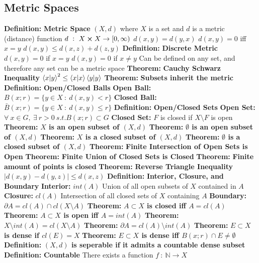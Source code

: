 \documentclass[14pt]{extarticle}
\def\Definition{{\color{Blue} \textbf{Definition:} }}
\def\Theorem{{\color{Red} \textbf{Theorem:} }}
\begin{document}
\begin{outline}
		\section{Metric Spaces}
		\1	\Definition \textbf{Metric Space}
			\2	$(X,d)$ where $X$ is a set and $d$ is a metric (distance) function
			\2	$d~:~X \cross X \rightarrow [0,\infty)$
				\3	$d(x,y) = d(y,x)$
				\3	$d(x,y) = 0$ iff $x = y$
				\3	$d(x,y) \le d(x,z) + d(z,y)$
		\1	\Definition \textbf{Discrete Metric}
			\2	$d(x,y) = 0$ if $x = y$
			\2	$d(x,y) = 0$ if $x \ne y$
			\2	Can be defined on any set, and therefore any set can be a metric space
		\1	\Theorem \textbf{Cauchy Schwarz Inequality}
			\2	$\braket{x}{y}^2 \le \braket{x}{x}\braket{y}{y}$
		\1	\Theorem \textbf{Subsets inherit the metric}
		\1	\Definition \textbf{Open/Closed Balls}
			\2	\textbf{Open Ball: } $B(x;r) = \{y \in X~:~d(x,y) < r\}$
			\2	\textbf{Closed Ball: } $\bar{B}(x;r) = \{y \in X~:~d(x,y) \le r\}$
		\1	\Definition \textbf{Open/Closed Sets}
			\2	\textbf{Open Set: } $\forall~x \in G,~\exists~r > 0~s.t. B(x;r) \subset G$
			\2	\textbf{Closed Set: } $F$ is closed if $X \setminus F$ is open
			\2	\Theorem \textbf{$X$ is an open subset of $(X,d)$}
			\2	\Theorem \textbf{$\emptyset$ is an open subset of $(X,d)$}
			\2	\Theorem \textbf{$X$ is a closed subset of $(X,d)$}
			\2	\Theorem \textbf{$\emptyset$ is a closed subset of $(X,d)$}
			\2	\Theorem \textbf{Finite Intersection of Open Sets is Open}
			\2	\Theorem \textbf{Finite Union of Closed Sets is Closed}
			\2	\Theorem \textbf{Finite amount of points is closed}
		\1	\Theorem \textbf{Reverse Triangle Inequality}
			\2	$|d(x,y) - d(y,z)| \le d(x,z)$
		\1	\Definition \textbf{Interior, Closure, and Boundary}
			\2	\textbf{Interior: } $int(A)$ Union of all open subsets of $X$ contained in $A$
			\2	\textbf{Closure: } $cl(A)$ Intersection of all closed sets of $X$ containing $A$
			\2	\textbf{Boundary: } $\partial A = cl(A) \cap cl(X \setminus A)$
		\1	\Theorem \textbf{$A \subset X$ is closed iff $A = cl(A)$}
		\1	\Theorem \textbf{$A \subset X$ is open iff $A = int(A)$}
		\1	\Theorem \textbf{$X \setminus int(A) = cl(X \setminus A)$}
		\1	\Theorem \textbf{$\partial A = cl(A) \setminus int(A)$}
		\1	\Theorem \textbf{$E \subset X$ is dense if $cl(E) = X$}
		\1	\Theorem \textbf{$E \subset X$ is dense iff $B(x;r) \cap E \ne \emptyset$}
		\1	\Definition \textbf{$(X,d)$ is seperable if it admits a countable dense subset}
		\1	\Definition \textbf{Countable}
			\2	There exists a function $f~:~\mathbb{N} \rightarrow X$	

\end{outline}
\end{document}
